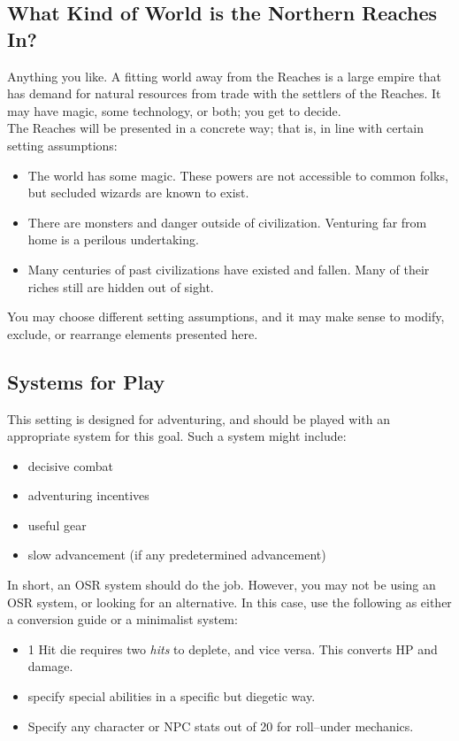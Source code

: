 \documentclass[notitlepage]{article}
\begin{document}
\begin{multicols}{2}
\subsection*{What Kind of World is the Northern Reaches In?}

Anything you like.
A fitting world away from the Reaches is a large empire that has demand for natural resources from trade with the settlers of the Reaches.
It may have magic, some technology, or both; you get to decide. \\

The Reaches will be presented in a concrete way; that is, in line with certain setting assumptions:

\begin{itemize}
\item The world has some magic. These powers are not accessible to common folks, but secluded wizards are known to exist.
\item There are monsters and danger outside of civilization. Venturing far from home is a perilous undertaking.
\item Many centuries of past civilizations have existed and fallen. Many of their riches still are hidden out of sight. 
\end{itemize}

You may choose different setting assumptions, and it may make sense to modify, exclude, or rearrange elements presented here.


\subsection*{Systems for Play}

This setting is designed for adventuring, and should be played with an appropriate system for this goal.
Such a system might include:

\begin{itemize}
\item decisive combat
\item adventuring incentives
\item useful gear
\item slow advancement (if any predetermined advancement)
\end{itemize}

In short, an OSR system should do the job.
However, you may not be using an OSR system, or looking for an alternative.
In this case, use the following as either a conversion guide or a minimalist system:

\begin{itemize}
\item 1 Hit die requires two \emph{hits} to deplete, and vice versa. This converts HP and damage.
\item specify special abilities in a specific but diegetic way.
\item Specify any character or NPC stats out of 20 for roll--under mechanics.
\end{itemize}


\end{multicols}
\end{document}
